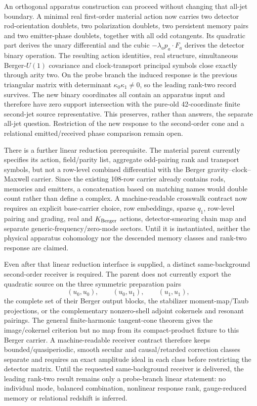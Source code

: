 \documentclass[11pt]{article}
\theoremstyle{definition}
\theoremstyle{remark}
\begin{document}
An orthogonal apparatus construction can proceed without changing that
all-jet boundary.  A minimal real first-order material action now carries
two detector rod-orientation doublets, two polarization doublets, two
persistent memory pairs and two emitter-phase doublets, together with all
odd cotangents.  Its quadratic part derives the unary differential and the
cubic \(-\lambda_a p_a\mathbin{\cdot}F_a\) derives the detector binary
operation.  The resulting action identities, real structure, simultaneous
Berger-\(U(1)\) covariance and clock-transport principal symbols close
exactly through arity two.  On the probe branch the induced response is the
previous triangular matrix with determinant
\(\kappa_0\kappa_1\ne0\), so the leading rank-two record survives.  The new
binary coordinates all contain an apparatus input and therefore have zero
support intersection with the pure-old 42-coordinate finite second-jet
source representative.  This preserves, rather than answers, the separate
all-jet question.  Restriction of the new response to the second-order cone
and a relational emitted/received phase comparison remain open.

There is a further linear reduction prerequisite.  The material parent
currently specifies its action, field/parity list, aggregate odd-pairing
rank and transport symbols, but not a row-level combined differential with
the Berger gravity--clock--Maxwell carrier.  Since the existing 108-row
carrier already contains rods, memories and emitters, a concatenation based
on matching names would double count rather than define a complex.  A
machine-readable crosswalk contract now requires an explicit base-carrier
choice, row embeddings, sparse \(q_1\), row-level pairing and grading,
real and \(K_{\rm Berger}\) actions, detector-smearing chain map and separate
generic-frequency/zero-mode sectors.  Until it is instantiated, neither the
physical apparatus cohomology nor the descended memory classes and
rank-two response are claimed.

Even after that linear reduction interface is supplied, a distinct
same-background second-order receiver is required.  The parent does not
currently export the quadratic source on the three symmetric preparation
pairs
\[
 (u_0,u_0),\qquad (u_0,u_1),\qquad (u_1,u_1),
\]
the complete set of their Berger output blocks, the stabilizer
moment-map/Taub projections, or the complementary nonzero-shell adjoint
cokernels and resonant pairings.  The general finite-harmonic tangent-cone
theorem gives the image/cokernel criterion but no map from its compact-product
fixture to this Berger carrier.  A machine-readable receiver contract
therefore keeps bounded/quasiperiodic, smooth secular and causal/retarded
correction classes separate and requires an exact amplitude ideal in each
class before restricting the detector matrix.  Until the requested
same-background receiver is delivered, the leading rank-two result remains
only a probe-branch linear statement: no individual mode, balanced
combination, nonlinear response rank, gauge-reduced memory or relational
redshift is inferred.
\end{document}
